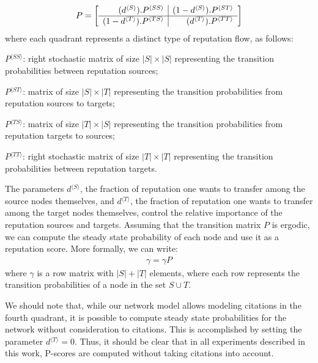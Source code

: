\documentclass[man]{apa6}
\begin{document}
\newcommand{\bkt}[1]{ {^{\langle #1 \rangle}} }

\begin{align}\label{eq:newp}
P =
\left[
\begin{array}{r | r}
(d\bkt{S}) . P\bkt{SS}  & (1-d\bkt{S}) . P\bkt{ST} \\
\hline
(1-d\bkt{T}) . P\bkt{TS}  & (d\bkt{T}) . P\bkt{TT} \\
\end{array}
\right]
\end{align}
\noindent where each quadrant represents a distinct type of reputation flow, as follows: 

\begin{description}
\item $P\bkt{SS}$: right stochastic matrix of size $|S|\times |S|$ representing the transition probabilities between reputation sources;
\item $P\bkt{ST}$: matrix of size $|S|\times |T|$ representing the transition probabilities from reputation sources to targets;
\item $P\bkt{TS}$: matrix of size $|T|\times |S|$ representing the transition probabilities from reputation targets to sources;
\item $P\bkt{TT}$: right stochastic matrix of size $|T|\times |T|$ representing the transition probabilities between reputation targets.
\end{description}

The parameters $d\bkt{S}$, the fraction of reputation one wants to transfer among the source nodes themselves, 
and $d\bkt{T}$, the fraction of reputation one wants to transfer among the target nodes themselves,
control the relative importance of the reputation sources and targets. 
Assuming that the transition matrix $P$ is ergodic, we can compute the steady state probability of each node and use it as a reputation score. 
More formally, we can write: 
\begin{align}
\label{eq:ggP}
\gamma = \gamma P
\end{align}
\noindent where $\gamma$ is a row matrix with $|S|+|T|$ elements, 
where each row represents the transition probabilities of a node in the set $S\cup T$. 

We should note that, while our network model allows modeling citations in the fourth quadrant, it is possible to compute 
steady state probabilities for the network without consideration to citations. This is accomplished by setting the parameter 
$d\bkt{T} = 0$. 
Thus, it should be clear that in all experiments described in this work, P-scores 
are computed without taking citations into account. 
\end{document}
